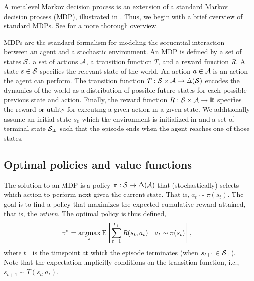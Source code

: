 A metalevel Markov decision process is an extension of a standard Markov decision process (MDP), illustrated in . Thus, we begin with a brief overview of standard MDPs. See \citet{sutton2018reinforcement} for a more thorough overview.

MDPs are the standard formalism for modeling the sequential interaction between an agent and a stochastic environment. An MDP is defined by a set of states $\S$, a set of actions $\A$, a transition function $T$, and a reward function $R$. A state $s \in \S$ specifies the relevant state of the world. An action $a \in \A$ is an action the agent can perform. The transition function $T: \S \times \A \rightarrow \Delta(\S)$\footnotemark{} encodes the dynamics of the world as a distribution of possible future states for each possible previous state and action. Finally, the reward function $R: \S \times \A \rightarrow \R $ specifies the reward or utility for executing a given action in a given state. We additionally assume an initial state $s_0$ which the environment is initialized in and a set of terminal state $\S_\bot$ such that the episode ends when the agent reaches one of those states.



\subsection{Optimal policies and value functions}

The solution to an MDP is a policy $\pi: \S \rightarrow \Delta(\A)$ that (stochastically) selects which action to perform next given the current state. That is, $a_t \sim \pi(s_t)$. The goal is to find a policy that maximizes the expected cumulative reward attained, that is, the \emph{return}. The optimal policy is thus defined,
\begin{equation}\label{eq:optimal-policy}
  \pi^* = \argmax_\pi \expect{
    \sum_{t=1}^{t_\bot} R(s_t, a_t)
  }{
   a_t \sim \pi(s_t)
  },
\end{equation}
where $t_\bot$ is the timepoint at which the episode terminates (when $s_{t+1} \in \S_\bot$). Note that the expectation implicitly conditions on the transition function, i.e., $s_{t+1} \sim T(s_t, a_t)$.

